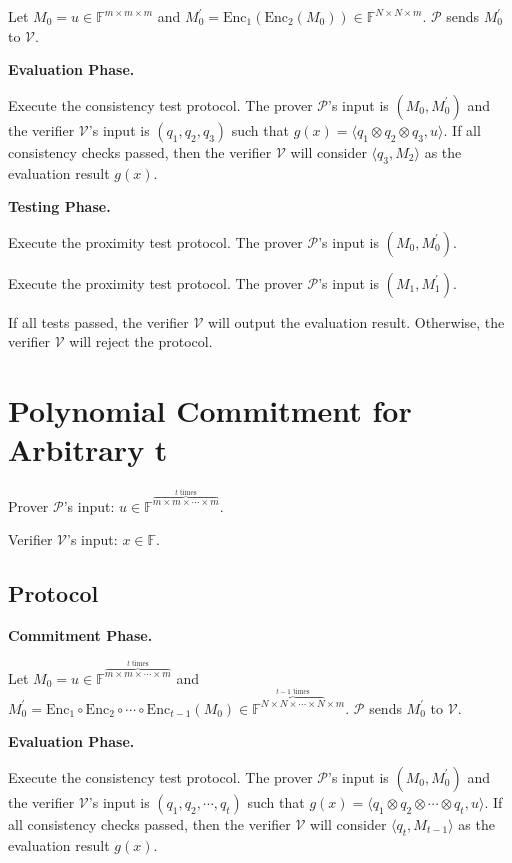 Let $M_0 = u \in \mathbb{F}^{m \times m \times m}$ and $M_0^{\prime} = \text{Enc}_1(\text{Enc}_2(M_0)) \in \mathbb{F}^{N \times N \times m}$. $\mathcal{P}$ sends $M_0^{\prime}$ to $\mathcal{V}$.


\textbf{Evaluation Phase.}

Execute the consistency test protocol. The prover $\mathcal{P}$'s input is $(M_0, M_0^{\prime})$ and the verifier $\mathcal{V}$'s input is $(q_1, q_2, q_3)$ such that $g(x) =\langle q_1 \otimes q_2 \otimes q_3, u \rangle$.
If all consistency checks passed, then the verifier $\mathcal{V}$ will consider $\langle q_3, M_{2} \rangle$ as the evaluation result $g(x)$. 

\textbf{Testing Phase.}

Execute the proximity test protocol. The prover $\mathcal{P}$'s input is $(M_0, M_0^{\prime})$.

Execute the proximity test protocol. The prover $\mathcal{P}$'s input is $(M_1, M_1^{\prime})$.

If all tests passed, the verifier $\mathcal{V}$ will output the evaluation result. Otherwise, the verifier $\mathcal{V}$ will reject the protocol.

\section{Polynomial Commitment for Arbitrary t}

Prover $\mathcal{P}$'s input: $u \in \mathbb{F}^{\overbrace{m \times m \times \cdots \times m}^{t \text{ times}}}$.

Verifier $\mathcal{V}$'s input: $x \in \mathbb{F}$.

\subsection{Protocol}

\textbf{Commitment Phase.}

Let $M_0 = u \in \mathbb{F}^{\overbrace{m \times m \times \cdots \times m}^{t \text{ times}}}$ and $ M_0^{\prime} = \text{Enc}_1 \circ \text{Enc}_2 \circ \cdots \circ \text{Enc}_{t-1} (M_0) \in \mathbb{F}^{\overbrace{N \times N \times \cdots \times N}^{t-1 \text{ times}} \times m}$. $\mathcal{P}$ sends $M_0^{\prime}$ to $\mathcal{V}$.

\textbf{Evaluation Phase.}

Execute the consistency test protocol. The prover $\mathcal{P}$'s input is $(M_0, M_0^{\prime})$ and the verifier $\mathcal{V}$'s input is $(q_1, q_2, \cdots, q_t)$ such that $g(x) =\langle q_1 \otimes q_2 \otimes \cdots \otimes q_t, u \rangle $.
If all consistency checks passed, then the verifier $\mathcal{V}$ will consider $\langle q_t, M_{t-1} \rangle$ as the evaluation result $g(x)$. 


